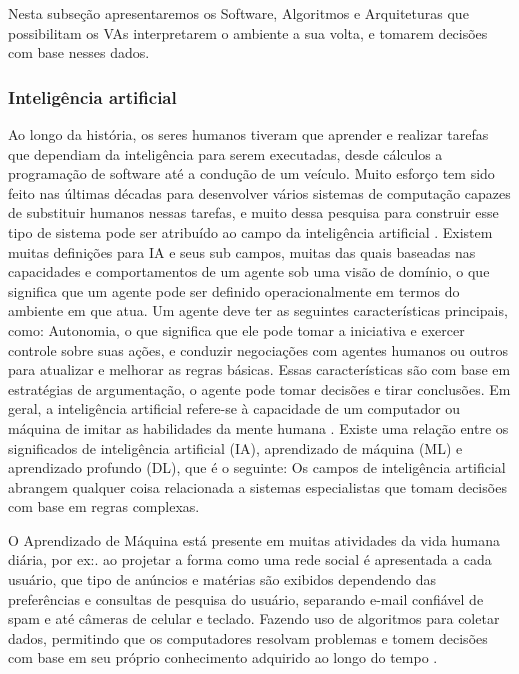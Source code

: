 Nesta subseção apresentaremos os Software, Algoritmos e Arquiteturas que possibilitam os VAs interpretarem o ambiente a sua volta, e tomarem decisões com base nesses dados. 


\subsubsection{Inteligência artificial}

Ao longo da história, os seres humanos tiveram que aprender e realizar tarefas que dependiam da inteligência para serem executadas, desde cálculos a programação de software até a condução de um veículo. Muito esforço tem sido feito nas últimas décadas para desenvolver vários sistemas de computação capazes de substituir humanos nessas tarefas, e muito dessa pesquisa para construir esse tipo de sistema pode ser atribuído ao campo da inteligência artificial \cite{caio}. 
Existem muitas definições para IA e seus sub campos, muitas das quais baseadas nas capacidades e comportamentos de um agente sob uma visão de domínio, o que significa que um agente pode ser definido operacionalmente em termos do ambiente em que atua.
Um agente deve ter as seguintes características principais, como: Autonomia, o que significa que ele pode tomar a iniciativa e exercer controle sobre suas ações, e conduzir negociações com agentes humanos ou outros para atualizar e melhorar as regras básicas.
Essas características são com base em estratégias de argumentação, o agente pode tomar decisões e tirar conclusões. Em geral, a inteligência artificial refere-se à capacidade de um computador ou máquina de imitar as habilidades da mente humana \cite{software-ia}. Existe uma relação entre os significados de inteligência artificial (IA), aprendizado de máquina (ML) e aprendizado profundo (DL), que é o seguinte: Os campos de inteligência artificial abrangem qualquer coisa relacionada a sistemas especialistas que tomam decisões com base em regras complexas.


O Aprendizado de Máquina está presente em muitas atividades da vida humana diária, por ex:. ao projetar a forma como uma rede social é apresentada a cada usuário, que tipo de anúncios e matérias são exibidos dependendo das preferências e consultas de pesquisa do usuário, separando e-mail confiável de spam e até câmeras de celular e teclado. Fazendo uso de algoritmos para coletar dados, permitindo que os computadores resolvam problemas e tomem decisões com base em seu próprio conhecimento adquirido ao longo do tempo \cite{caio}.

